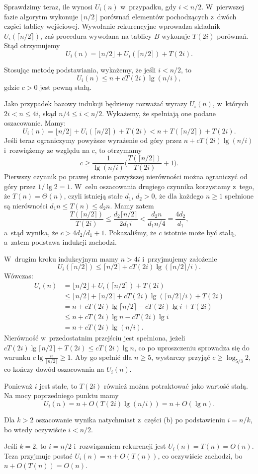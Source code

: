Sprawdzimy teraz, ile wynosi $U_i(n)$ w~przypadku, gdy $i<n/2$.
W~pierwszej fazie algorytm wykonuje $\lfloor n/2\rfloor$ porównań elementów pochodzących z~dwóch części tablicy wejściowej.
Wywołanie rekurencyjne wprowadza składnik $U_i(\lceil n/2\rceil)$, zaś procedura  wywołana na tablicy $B$ wykonuje $T(2i)$ porównań.
Stąd otrzymujemy
\[
    U_i(n) = \lfloor n/2\rfloor+U_i(\lceil n/2\rceil)+T(2i).
\]

\subproblem %
Stosując metodę podstawiania, wykażemy, że jeśli $i<n/2$, to
\[
	U_i(n) \le n+cT(2i)\lg(n/i),
\]
gdzie $c>0$ jest pewną stałą.

Jako przypadek bazowy indukcji będziemy rozważać wyrazy $U_i(n)$, w~których $2i<n\le4i$, skąd $n/4\le i<n/2$.
Wykażemy, że spełniają one podane oszacowanie.
Mamy:
\[
    U_i(n) = \lfloor n/2\rfloor+U_i(\lceil n/2\rceil)+T(2i) < n+T(\lceil n/2\rceil)+T(2i).
\]
Jeśli teraz ograniczymy powyższe wyrażenie od góry przez $n+cT(2i)\lg(n/i)$ i~rozwiążemy ze względu na $c$, to otrzymamy
\[
    c \ge \frac{1}{\lg(n/i)}\biggl(\frac{T(\lceil n/2\rceil)}{T(2i)}+1\biggr).
\]
Pierwszy czynnik po prawej stronie powyższej nierówności można ograniczyć od góry przez $1/\lg2=1$.
W~celu oszacowania drugiego czynnika korzystamy z~tego, że $T(n)=\Theta(n)$, czyli istnieją stałe $d_1$, $d_2>0$, że dla każdego $n\ge1$ spełnione są nierówności $d_1n\le T(n)\le d_2n$.
Mamy zatem
\[
    \frac{T(\lceil n/2\rceil)}{T(2i)} \le \frac{d_2\lceil n/2\rceil}{2d_1i} < \frac{d_2n}{d_1n/4} = \frac{4d_2}{d_1},
\]
a~stąd wynika, że $c>4d_2/d_1+1$.
Pokazaliśmy, że $c$ istotnie może być stałą, a~zatem podstawa indukcji zachodzi.

W~drugim kroku indukcyjnym mamy $n>4i$ i~przyjmujemy założenie
\[
    U_i(\lceil n/2\rceil) \le \lceil n/2\rceil+cT(2i)\lg(\lceil n/2\rceil/i).
\]
Wówczas:
\begin{align*}
    U_i(n) &= \lfloor n/2\rfloor+U_i(\lceil n/2\rceil)+T(2i) \\
	&\le \lfloor n/2\rfloor+\lceil n/2\rceil+cT(2i)\lg(\lceil n/2\rceil/i)+T(2i) \\
	&= n+cT(2i)\lg\lceil n/2\rceil-cT(2i)\lg i+T(2i) \\
	&\le n+cT(2i)\lg n-cT(2i)\lg i \\
    &= n+cT(2i)\lg(n/i).
\end{align*}
Nierówność w~przedostatnim przejściu jest spełniona, jeżeli $cT(2i)\lg\lceil n/2\rceil+T(2i)\le cT(2i)\lg n$, co po uproszczeniu sprowadza się do warunku $c\lg\frac{n}{\lceil n/2\rceil}\ge1$.
Aby go spełnić dla $n\ge5$, wystarczy przyjąć $c\ge\log_{5/3}2$, co kończy dowód oszacowania na $U_i(n)$.

\subproblem %
Ponieważ $i$ jest stałe, to $T(2i)$ również można potraktować jako wartość stałą.
Na mocy poprzedniego punktu mamy
\[
	U_i(n) = n+O(T(2i)\lg(n/i)) = n+O(\lg n).
\]

\subproblem %
Dla $k>2$ oszacowanie wynika natychmiast z~części (b) po podstawieniu $i=n/k$, bo wtedy oczywiście $i<n/2$.

Jeśli $k=2$, to $i=n/2$ i~rozwiązaniem rekurencji jest $U_i(n)=T(n)=O(n)$.
Teza przyjmuje postać $U_i(n)=n+O(T(n))$, co oczywiście zachodzi, bo $n+O(T(n))=O(n)$.

